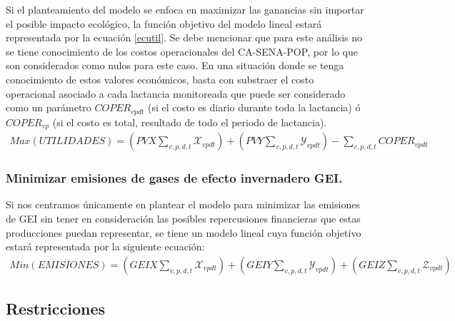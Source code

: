 Si el planteamiento del modelo se enfoca en maximizar las ganancias sin importar el posible impacto ecológico, la función objetivo del modelo lineal estará representada por la ecuación \ref{ecutil}. Se debe mencionar que para este análisis no se tiene conocimiento de los costos operacionales del CA-SENA-POP, por lo que son considerados como nulos para este caso. En una situación donde se tenga conocimiento de estos valores económicos, basta con substraer el costo operacional asociado a cada lactancia monitoreada que puede ser considerado como un parámetro $COPER_{vpdt}$ (si el costo es diario durante toda la lactancia) ó $COPER_{vp}$ (si el costo es total, resultado de todo el periodo de lactancia).
\begin{equation}\label{ecutil}
    \begin{split}
        Max(UTILIDADES) =\left(PVX\sum_{v,p,d,t}\mathcal{X}_{vpdt}\right) + \left(PVY\sum_{v,p,d,t}\mathcal{Y}_{vpdt} \right) - \sum_{v,p,d,t}COPER_{vpdt}
    \end{split}
\end{equation}

\subsubsection{Minimizar emisiones de gases de efecto invernadero GEI.}

Si nos centramos únicamente en plantear el modelo para minimizar las emisiones de GEI sin tener en consideración las posibles repercusiones financieras que estas producciones puedan representar, se tiene un modelo lineal cuya función objetivo estará representada por la siguiente ecuación:
\begin{equation}\label{ecemis}
    \begin{split}
        Min(EMISIONES) =\left( GEIX\sum_{v,p,d,t}\mathcal{X}_{vpdt}\right) + \left(GEIY\sum_{v,p,d,t}\mathcal{Y}_{vpdt}\right) + \left(GEIZ\sum_{v,p,d,t}\mathcal{Z}_{vpdt} \right)
    \end{split}
\end{equation}


\subsection{Restricciones}
